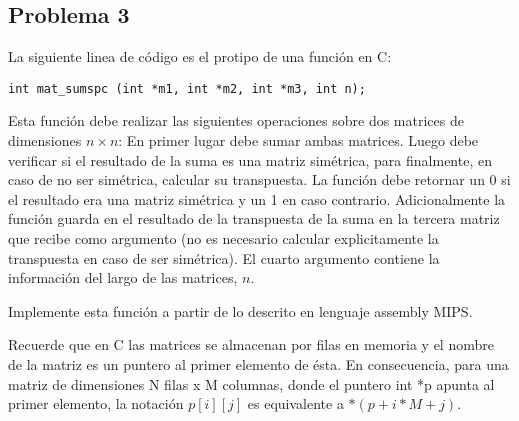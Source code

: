 \documentclass[letterpaper,11pt,notitlepage]{article}
\begin{document}
%
%          
%          
%          
\newpage
\subsection*{Problema 3}

La siguiente linea de código es el protipo de una función en C:
\begin{lstlisting}[style=C]
  int mat_sumspc (int *m1, int *m2, int *m3, int n);
\end{lstlisting}
Esta función debe realizar las siguientes operaciones sobre dos matrices de dimensiones $n\times n$: En primer lugar debe sumar ambas matrices. Luego debe verificar si el resultado de la suma es una matriz simétrica, para finalmente, en caso de no ser simétrica, calcular su transpuesta. La función debe retornar un 0 si el resultado era una matriz simétrica y un 1 en caso contrario. Adicionalmente la función guarda en el resultado de la transpuesta de la suma en la tercera matriz que recibe como argumento (no es necesario calcular explicitamente la transpuesta en caso de ser simétrica). El cuarto argumento contiene la información del largo de las matrices, $n$.

Implemente esta función a partir de lo descrito en lenguaje assembly MIPS.

Recuerde que en C las matrices se almacenan por filas en memoria y el nombre de la matriz es un puntero al primer elemento de ésta. En consecuencia, para una matriz de dimensiones N filas x M columnas, donde el puntero int *p apunta al primer elemento, la notación $p[i][j]$ es equivalente a $*(p + i*M + j)$.
\end{document}

